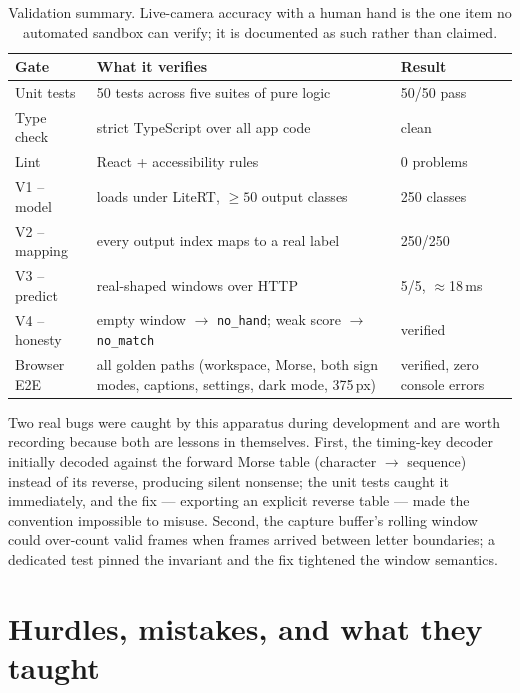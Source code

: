 \documentclass[11pt,a4paper]{article}
\newcommand{\code}[1]{\texttt{#1}}
\begin{document}
\begin{table}[t]
\centering
\small
\begin{tabularx}{\textwidth}{@{}lXl@{}}
\toprule
\textbf{Gate} & \textbf{What it verifies} & \textbf{Result} \\
\midrule
Unit tests & 50 tests across five suites of pure logic & 50/50 pass \\
Type check & strict TypeScript over all app code & clean \\
Lint & React + accessibility rules & 0 problems \\
V1 -- model & loads under LiteRT, $\geq 50$ output classes & 250 classes \\
V2 -- mapping & every output index maps to a real label & 250/250 \\
V3 -- predict & real-shaped windows over HTTP & 5/5, $\approx$18\,ms \\
V4 -- honesty & empty window $\to$ \code{no\_hand}; weak score $\to$ \code{no\_match} & verified \\
Browser E2E & all golden paths (workspace, Morse, both sign modes, captions, settings, dark mode, 375\,px) & verified, zero console errors \\
\bottomrule
\end{tabularx}
\caption{Validation summary. Live-camera accuracy with a human hand is the one item no automated sandbox can verify; it is documented as such rather than claimed.}
\label{tab:validation}
\end{table}

Two real bugs were caught by this apparatus during development and are worth recording because both are lessons in themselves. First, the timing-key decoder initially decoded against the forward Morse table (character $\to$ sequence) instead of its reverse, producing silent nonsense; the unit tests caught it immediately, and the fix --- exporting an explicit reverse table --- made the convention impossible to misuse. Second, the capture buffer's rolling window could over-count valid frames when frames arrived between letter boundaries; a dedicated test pinned the invariant and the fix tightened the window semantics.

\section{Hurdles, mistakes, and what they taught}
\end{document}
